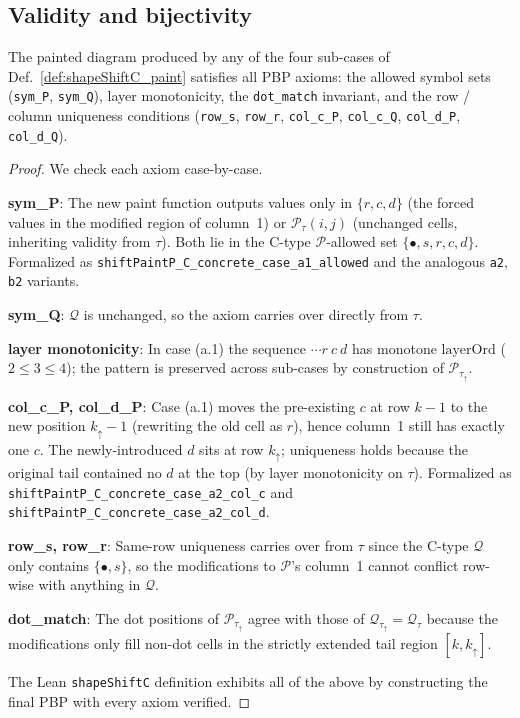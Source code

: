 \subsection{Validity and bijectivity}

\begin{lemma}
  \label{cor:shapeShiftC_valid}
  \leanok
  The painted diagram produced by any of the four sub-cases of
  Def.~\ref{def:shapeShiftC_paint} satisfies all PBP axioms: the allowed
  symbol sets (\texttt{sym\_P}, \texttt{sym\_Q}), layer monotonicity, the
  \texttt{dot\_match} invariant, and the row / column uniqueness conditions
  (\texttt{row\_s}, \texttt{row\_r}, \texttt{col\_c\_P}, \texttt{col\_c\_Q},
  \texttt{col\_d\_P}, \texttt{col\_d\_Q}).
\end{lemma}
\begin{proof}
  \leanok
  We check each axiom case-by-case.

  \textbf{sym\_P}: The new paint function outputs values only in
  $\{r, c, d\}$ (the forced values in the modified region of column~1) or
  $\mathcal{P}_\tau(i, j)$ (unchanged cells, inheriting validity from $\tau$).
  Both lie in the C-type $\mathcal{P}$-allowed set $\{\bullet, s, r, c, d\}$.
  Formalized as \texttt{shiftPaintP\_C\_concrete\_case\_a1\_allowed} and
  the analogous \texttt{a2}, \texttt{b2} variants.

  \textbf{sym\_Q}: $\mathcal{Q}$ is unchanged, so the axiom carries over
  directly from $\tau$.

  \textbf{layer monotonicity}: In case (a.1) the sequence $\cdots r\ c\ d$
  has monotone $\mathrm{layerOrd}$ ($2 \le 3 \le 4$); the pattern is
  preserved across sub-cases by construction of $\mathcal{P}_{\tau_\uparrow}$.

  \textbf{col\_c\_P, col\_d\_P}: Case (a.1) moves the pre-existing $c$ at
  row $k-1$ to the new position $k_\uparrow - 1$ (rewriting the old cell as
  $r$), hence column~1 still has exactly one $c$. The newly-introduced $d$
  sits at row $k_\uparrow$; uniqueness holds because the original tail
  contained no $d$ at the top (by layer monotonicity on $\tau$).
  Formalized as \texttt{shiftPaintP\_C\_concrete\_case\_a2\_col\_c} and
  \texttt{shiftPaintP\_C\_concrete\_case\_a2\_col\_d}.

  \textbf{row\_s, row\_r}: Same-row uniqueness carries over from $\tau$
  since the C-type $\mathcal{Q}$ only contains $\{\bullet, s\}$, so the
  modifications to $\mathcal{P}$'s column~1 cannot conflict row-wise with
  anything in $\mathcal{Q}$.

  \textbf{dot\_match}: The dot positions of $\mathcal{P}_{\tau_\uparrow}$
  agree with those of $\mathcal{Q}_{\tau_\uparrow} = \mathcal{Q}_\tau$
  because the modifications only fill non-dot cells in the strictly
  extended tail region $[k, k_\uparrow]$.

  The Lean \texttt{shapeShiftC} definition exhibits all of the above by
  constructing the final PBP with every axiom verified.
\end{proof}


